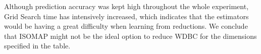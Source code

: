 Although prediction accuracy was kept high throughout the whole experiment, Grid Search time has intensively increased, which indicates that the estimators would be having a great difficulty when learning from reductions. We conclude that ISOMAP might not be the ideal option to reduce WDBC for the dimensions specified in the table.
